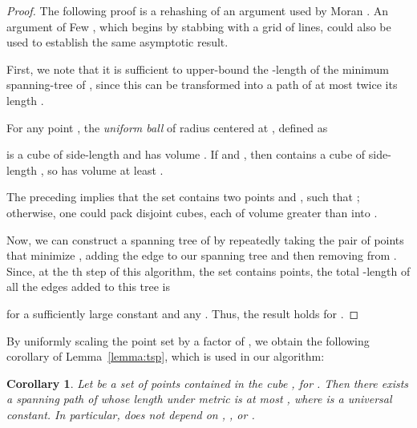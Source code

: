 \documentclass[11pt]{patmorin}
\newtheorem{corollary}[theorem]{Corollary}
\begin{document}
\begin{proof}
The following proof is a rehashing of an argument used by Moran
\cite{moran:on}. An argument of Few \cite{few:shortest}, which begins
by stabbing  with a grid of  lines, could
also be used to establish the same asymptotic result.

First, we note that it is sufficient to upper-bound the -length of the minimum spanning-tree of , since this
can be transformed into a path of at most twice its length \cite{rosenkrantz.stearns.ea:analysis}.

For any point , the \emph{uniform ball} of radius  centered at ,
defined as

is a cube of side-length  and has volume .  If  and
, then  contains a cube of side-length , so  has volume at least .  

The preceding implies that the set  contains two points  and ,
such that ; otherwise, one could pack 
disjoint cubes, each of volume greater than  into .

Now, we can construct a spanning tree of  by repeatedly taking the
pair of points  that minimize , adding the edge 
to our spanning tree and then removing  from . Since, at the th
step of this algorithm, the set  contains  points, the total -length of all the edges added to this tree is

for a sufficiently large constant  and any . Thus, the result holds for .
\end{proof}

By uniformly scaling the point set  by a factor of , we obtain the following corollary of Lemma~\ref{lemma:tsp}, which is used in our algorithm:

\begin{corollary}\label{cor:tsp}
  Let  be a set of  points contained in the cube ,
  for .  Then there exists a spanning path of
   whose length under  metric is at
  most , where  is a universal constant. In particular,
   does not depend on , , or .
\end{corollary}
\end{document}

